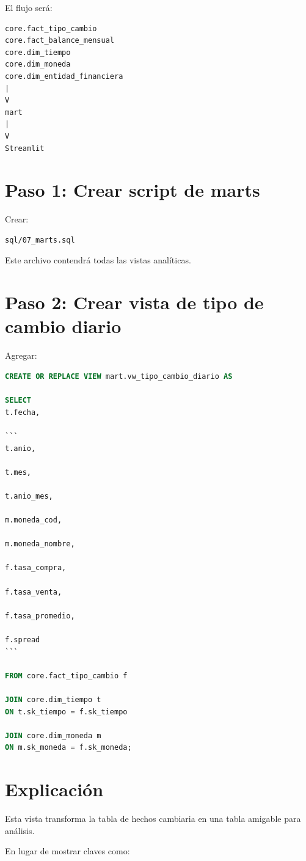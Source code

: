 El flujo será:

\begin{verbatim}
core.fact_tipo_cambio
core.fact_balance_mensual
core.dim_tiempo
core.dim_moneda
core.dim_entidad_financiera
|
V
mart
|
V
Streamlit
\end{verbatim}

\section{Paso 1: Crear script de marts}

Crear:

\begin{verbatim}
sql/07_marts.sql
\end{verbatim}

Este archivo contendrá todas las vistas analíticas.

\section{Paso 2: Crear vista de tipo de cambio diario}

Agregar:

\begin{lstlisting}[language=SQL]
CREATE OR REPLACE VIEW mart.vw_tipo_cambio_diario AS

SELECT
t.fecha,

```
t.anio,

t.mes,

t.anio_mes,

m.moneda_cod,

m.moneda_nombre,

f.tasa_compra,

f.tasa_venta,

f.tasa_promedio,

f.spread
```

FROM core.fact_tipo_cambio f

JOIN core.dim_tiempo t
ON t.sk_tiempo = f.sk_tiempo

JOIN core.dim_moneda m
ON m.sk_moneda = f.sk_moneda;
\end{lstlisting}

\section{Explicación}

Esta vista transforma la tabla de hechos cambiaria en una tabla amigable para análisis.

En lugar de mostrar claves como:

